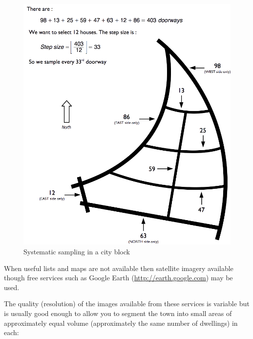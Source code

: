 \documentclass[12pt,a4paper]{book}
\theoremstyle{definition}
\theoremstyle{definition}
\theoremstyle{definition}
\theoremstyle{remark}
\begin{document}
\begin{figure}[H]

{\centering \includegraphics[width=800pt]{figures/stage2sample13} 

}

\caption{Systematic sampling in a city block}\label{fig:sample27}
\end{figure}

When useful lists and maps are not available then satellite imagery
available though free services such as Google Earth
(\url{http://earth.google.com}) may be used.

The quality (resolution) of the images available from these services is
variable but is usually good enough to allow you to segment the town
into small areas of approximately equal volume (approximately the same
number of dwellings) in each:
\end{document}
